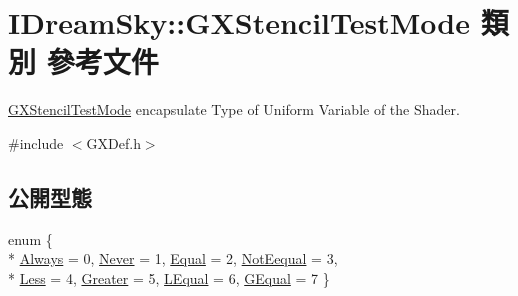 \hypertarget{class_i_dream_sky_1_1_g_x_stencil_test_mode}{}\section{I\+Dream\+Sky\+:\+:G\+X\+Stencil\+Test\+Mode 類別 參考文件}
\label{class_i_dream_sky_1_1_g_x_stencil_test_mode}


\hyperlink{class_i_dream_sky_1_1_g_x_stencil_test_mode}{G\+X\+Stencil\+Test\+Mode} encapsulate Type of Uniform Variable of the Shader.  




{\ttfamily \#include $<$G\+X\+Def.\+h$>$}

\subsection*{公開型態}
\begin{DoxyCompactItemize}
\item 
enum \{ \\*
\hyperlink{class_i_dream_sky_1_1_g_x_stencil_test_mode_a19e795f814b59e64cf9394fe9bd2a5f2a27e6fe286b708b529a9e4730087245fe}{Always} = 0, 
\hyperlink{class_i_dream_sky_1_1_g_x_stencil_test_mode_a19e795f814b59e64cf9394fe9bd2a5f2ac16b0e0d9a85aa28f900b2501dd29ab1}{Never} = 1, 
\hyperlink{class_i_dream_sky_1_1_g_x_stencil_test_mode_a19e795f814b59e64cf9394fe9bd2a5f2a54d96f9bd5824eecc85c1ba60c93e302}{Equal} = 2, 
\hyperlink{class_i_dream_sky_1_1_g_x_stencil_test_mode_a19e795f814b59e64cf9394fe9bd2a5f2a50e084a88df1607d94bb25a03fe724b1}{Not\+Eequal} = 3, 
\\*
\hyperlink{class_i_dream_sky_1_1_g_x_stencil_test_mode_a19e795f814b59e64cf9394fe9bd2a5f2abf83788a53313a239b88e7d16b3f8e7f}{Less} = 4, 
\hyperlink{class_i_dream_sky_1_1_g_x_stencil_test_mode_a19e795f814b59e64cf9394fe9bd2a5f2ac544a2a043f2a84df3f8b9f8a6f856a2}{Greater} = 5, 
\hyperlink{class_i_dream_sky_1_1_g_x_stencil_test_mode_a19e795f814b59e64cf9394fe9bd2a5f2a3d3e874b3f871e61cc9bfab2d0bb132e}{L\+Equal} = 6, 
\hyperlink{class_i_dream_sky_1_1_g_x_stencil_test_mode_a19e795f814b59e64cf9394fe9bd2a5f2a9401a2b967ed4afebca43d87775ea83b}{G\+Equal} = 7
 \}
\end{DoxyCompactItemize}
